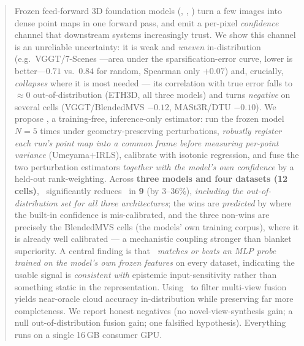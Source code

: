 \begin{abstract}
Frozen feed-forward 3D foundation models (\vggt, \pii, \mastr) turn a few images into dense
point maps in one forward pass, and emit a per-pixel \emph{confidence} channel that downstream
systems increasingly trust. We show this channel is an unreliable uncertainty: it is weak and
\emph{uneven} in-distribution (e.g.\ VGGT/7-Scenes \ause---area under the sparsification-error curve, lower is better---$0.71$ vs.\ $0.84$ for random, Spearman
only $+0.07$) and, crucially, \emph{collapses} where it is most needed --- its correlation with
true error falls to $\approx\!0$ out-of-distribution (ETH3D, all three models) and turns
\emph{negative} on several cells (VGGT/BlendedMVS $-0.12$, MASt3R/DTU $-0.10$). We propose
\trustr, a training-free, inference-only estimator: run the frozen model $N{=}5$ times under
geometry-preserving perturbations, \emph{robustly register each run's point map into a common
frame before measuring per-point variance} (Umeyama${+}$IRLS), calibrate with isotonic
regression, and fuse the two perturbation estimators \emph{together with the model's own
confidence} by a held-out rank-weighting. Across \textbf{three models
and four datasets (12 cells)}, \trustr\ significantly reduces \ause\ in \textbf{9} (by
$3\text{--}36\%$), \emph{including the out-of-distribution set for all three architectures}; the
wins are \emph{predicted} by where the built-in confidence is mis-calibrated, and the three
non-wins are precisely the BlendedMVS cells (the models' own training corpus), where it is
already well calibrated --- a mechanistic coupling
stronger than blanket superiority. A central finding is that \trustr\ \emph{matches or beats an
MLP probe trained on the model's own frozen features} on every dataset, indicating the usable
signal is \emph{consistent with} epistemic input-sensitivity rather than something static in the representation. Using
\trustr\ to filter multi-view fusion yields near-oracle cloud accuracy in-distribution while
preserving far more completeness. We report honest negatives (no novel-view-synthesis gain; a
null out-of-distribution fusion gain; one falsified hypothesis). Everything runs on a single
16\,GB consumer GPU.
\end{abstract}
